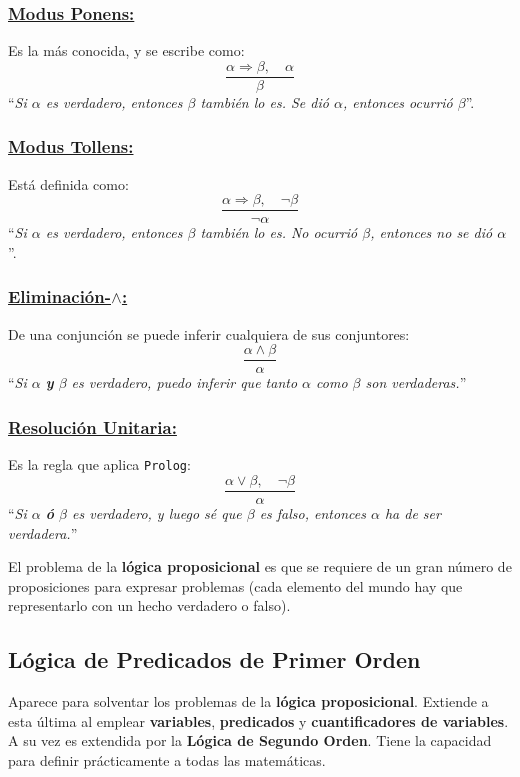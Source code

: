 \documentclass[10pt,a4paper]{article}
\begin{document}
\begin{multicols}{2}

\subsubsection*{\underline{Modus Ponens:}}
Es la más conocida, y se escribe como:
\[
\frac{\alpha \Rightarrow \beta, \quad \alpha}{\beta}
\]
``\textit{Si $\alpha$ es verdadero, entonces $\beta$ también lo es. Se dió $\alpha$, entonces ocurrió $\beta$}''.

\subsubsection*{\underline{Modus Tollens:}}
Está definida como:
\[
\frac{\alpha \Rightarrow \beta, \quad \neg \beta}{\neg\alpha}
\]
``\textit{Si $\alpha$ es verdadero, entonces $\beta$ también lo es. No ocurrió $\beta$, entonces no se dió $\alpha$}''.

\subsubsection*{\underline{Eliminación-$\land$:}}
De una conjunción se puede inferir cualquiera de sus conjuntores:
\[
\frac{\alpha \land \beta}{\alpha}
\]
``\textit{Si $\alpha$ \textbf{y} $\beta$ es verdadero, puedo inferir que tanto $\alpha$ como $\beta$ son verdaderas.}''

\subsubsection*{\underline{Resolución Unitaria:}}
Es la regla que aplica \texttt{Prolog}:
\[
\frac{\alpha \lor \beta, \quad \neg \beta}{\alpha}
\]
``\textit{Si $\alpha$ \textbf{ó} $\beta$ es verdadero, y luego sé que $\beta$ es falso, entonces $\alpha$ ha de ser verdadera.}''

\end{multicols}

El problema de la \textbf{lógica proposicional} es que se requiere de un gran número de proposiciones para expresar problemas (cada elemento del mundo hay que representarlo con un hecho verdadero o falso).

\subsection{Lógica de Predicados de Primer Orden}

Aparece para solventar los problemas de la \textbf{lógica proposicional}. Extiende a esta última al emplear \textbf{variables}, \textbf{predicados} y \textbf{cuantificadores de variables}. A su vez es extendida por la \textbf{Lógica de Segundo Orden}. Tiene la capacidad para definir prácticamente a todas las matemáticas.
\end{document}
